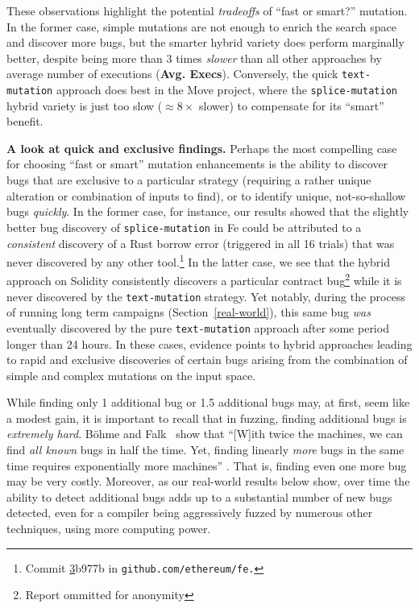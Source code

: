 \begin{sloppypar}
These observations highlight the potential \emph{tradeoffs} of ``fast or
smart?'' mutation. In the former case, simple mutations are not enough to
enrich the search space and discover more bugs, but the smarter hybrid variety
does perform marginally better, despite being more than 3 times \emph{slower}
than all other approaches by average number of executions (\textbf{Avg.
Execs}). Conversely, the quick \texttt{text-mutation} approach does best in the
Move project, where the \texttt{splice-mutation} hybrid variety is just too
slow ($\approx8\times$ slower) to compensate for its ``smart''
benefit.
\end{sloppypar}

\textbf{A look at quick and exclusive findings.} Perhaps the most compelling
case for choosing ``fast or smart'' mutation enhancements is the ability to
discover bugs that are exclusive to a particular strategy (requiring a rather
unique alteration or combination of inputs to find), or to identify unique,
not-so-shallow bugs \emph{quickly}. In the former case, for instance, our results
showed that the slightly better bug discovery of \texttt{splice-mutation} in Fe
could be attributed to a \emph{consistent} discovery of a Rust borrow error
(triggered in all 16 trials) that was never discovered by any other
tool.\footnote{Commit
\href{https://github.com/ethereum/fe/commit/3b977b3078eb163ba521f57d8509e16efdb9dbf4}
3b977b in \texttt{github.com/ethereum/fe.}} In the latter case, we see that the
hybrid approach on Solidity consistently discovers a particular contract
bug\footnote{Report ommitted for anonymity} while it is never discovered by the
\texttt{text-mutation} strategy. Yet notably, during the process of running long
term campaigns (Section~\ref{real-world}), this same bug \emph{was} eventually discovered by the pure
\texttt{text-mutation} approach after some period longer than 24 hours. In
these cases, evidence points to hybrid approaches leading to rapid and
exclusive discoveries of certain bugs arising from 
the combination of simple and complex mutations on the input space.

While finding only 1 additional bug or 1.5 additional bugs may, at
first, seem like a modest gain, it is important to recall that in
fuzzing, finding additional bugs is \emph{extremely hard}.  B\"{o}hme
and Falk~\cite{fuzzexp} show that ``[W]ith twice the machines, we can
find \emph{all known} bugs in half the time. Yet, finding linearly
\emph{more} bugs in the same time requires exponentially more
machines'' \cite{fuzzexp}.  That is, finding even one more bug may be
very costly.  Moreover, as our real-world results below show, over
time the ability to detect additional bugs adds up to a substantial
number of new bugs detected, even for a compiler being aggressively
fuzzed by numerous other techniques, using more computing power.

